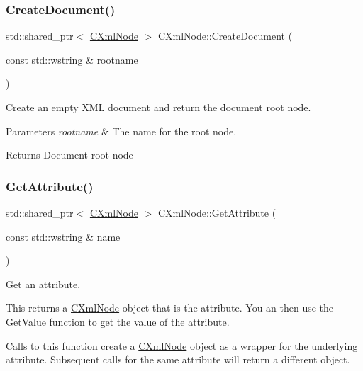 \subsubsection{\texorpdfstring{CreateDocument()}{CreateDocument()}}
{\footnotesize\ttfamily std\+::shared\+\_\+ptr$<$ \mbox{\hyperlink{classxmlnode_1_1_c_xml_node}{C\+Xml\+Node}} $>$ C\+Xml\+Node\+::\+Create\+Document (\begin{DoxyParamCaption}\item[{const std\+::wstring \&}]{rootname }\end{DoxyParamCaption})\hspace{0.3cm}{\ttfamily [static]}}



Create an empty X\+ML document and return the document root node. 


\begin{DoxyParams}{Parameters}
{\em rootname} & The name for the root node. \\
\hline
\end{DoxyParams}
\begin{DoxyReturn}{Returns}
Document root node 
\end{DoxyReturn}
\mbox{\label{classxmlnode_1_1_c_xml_node_aa571e6a48132a260420a077dde31168f}} 
\subsubsection{\texorpdfstring{GetAttribute()}{GetAttribute()}}
{\footnotesize\ttfamily std\+::shared\+\_\+ptr$<$ \mbox{\hyperlink{classxmlnode_1_1_c_xml_node}{C\+Xml\+Node}} $>$ C\+Xml\+Node\+::\+Get\+Attribute (\begin{DoxyParamCaption}\item[{const std\+::wstring \&}]{name }\end{DoxyParamCaption})}



Get an attribute. 

This returns a \mbox{\hyperlink{classxmlnode_1_1_c_xml_node}{C\+Xml\+Node}} object that is the attribute. You an then use the Get\+Value function to get the value of the attribute.

Calls to this function create a \mbox{\hyperlink{classxmlnode_1_1_c_xml_node}{C\+Xml\+Node}} object as a wrapper for the underlying attribute. Subsequent calls for the same attribute will return a different object.


